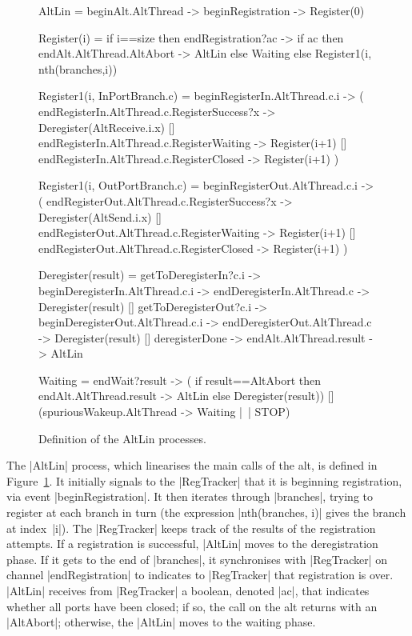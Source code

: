 \begin{figure}
\begin{cspm}
AltLin = beginAlt.AltThread -> beginRegistration -> Register(0)
  
Register(i) = 
  if i==size then endRegistration?ac -> 
    if ac then endAlt.AltThread.AltAbort -> AltLin else Waiting
  else Register1(i, nth(branches,i))
  
Register1(i, InPortBranch.c) = 
  beginRegisterIn.AltThread.c.i -> (
    endRegisterIn.AltThread.c.RegisterSuccess?x -> Deregister(AltReceive.i.x)
    [] endRegisterIn.AltThread.c.RegisterWaiting -> Register(i+1)
    [] endRegisterIn.AltThread.c.RegisterClosed -> Register(i+1)
  )

Register1(i, OutPortBranch.c) =
  beginRegisterOut.AltThread.c.i -> (
    endRegisterOut.AltThread.c.RegisterSuccess?x -> Deregister(AltSend.i.x)
    [] endRegisterOut.AltThread.c.RegisterWaiting -> Register(i+1)
    [] endRegisterOut.AltThread.c.RegisterClosed -> Register(i+1)
  )
  
Deregister(result) =
  getToDeregisterIn?c.i -> beginDeregisterIn.AltThread.c.i -> 
     endDeregisterIn.AltThread.c -> Deregister(result)
  [] getToDeregisterOut?c.i -> beginDeregisterOut.AltThread.c.i ->
     endDeregisterOut.AltThread.c -> Deregister(result)
  [] deregisterDone -> endAlt.AltThread.result -> AltLin
  
Waiting = 
  endWait?result -> (
    if result==AltAbort then endAlt.AltThread.result -> AltLin
    else Deregister(result))
  [] (spuriousWakeup.AltThread -> Waiting |~| STOP)
\end{cspm}
\caption{Definition of the {\scalastyle AltLin}
  processes.  \label{fig:AltLin}} 
\end{figure}


The |AltLin| process, which linearises the main calls of the alt, is defined
in Figure~\ref{fig:AltLin}. It initially signals to the |RegTracker| that it
is beginning registration, via event |beginRegistration|.  It then iterates
through |branches|, trying to register at each branch in turn (the expression
|nth(branches, i)| gives the branch at index~|i|).  The |RegTracker| keeps
track of the results of the registration attempts.  If a registration is
successful, |AltLin| moves to the deregistration phase.  If it gets to the end
of |branches|, it synchronises with |RegTracker| on channel |endRegistration|
to indicates to |RegTracker| that registration is over.  |AltLin| receives
from |RegTracker| a boolean, denoted |ac|, that indicates whether all ports
have been closed; if so, the call on the alt returns with an |AltAbort|;
otherwise, the |AltLin| moves to the waiting phase.

